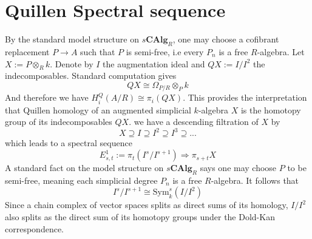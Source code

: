 \documentclass{article}
\newcommand{\Sym}{\textrm{Sym}}
\theoremstyle{definition}
\theoremstyle{definition}
\theoremstyle{definition}
\theoremstyle{definition}
\theoremstyle{definition}
\theoremstyle{definition}
\theoremstyle{definition}
\theoremstyle{definition}
\begin{document}
\appendix

\section{Quillen Spectral sequence}
By the standard model structure on $s \textbf{CAlg}_R$, one may choose a cofibrant replacement $P\to A$ such that $P$ is semi-free, i.e every $P_n$ is a free $R$-algebra.  Let $X:= P\otimes_R k$. Denote by $I$ the augmentation ideal and $QX:=I/I^2$ the indecomposables. Standard computation gives
\[QX\cong \Omega_{P/R}\otimes_P k\]
And therefore we have $H_i^Q(A/R)\cong \pi_i(QX)$. This provides the interpretation that Quillen homology of an augmented simplicial $k$-algebra $X$ is the homotopy group of its indecomposables $QX$. we have a descending filtration of $X$ by 
\[X\supseteq I\supseteq I^2\supseteq I^3\supseteq ...\]
which leads to a spectral sequence 
\[E^1_{s,t}:= \pi_t(I^s/I^{s+1})\Rightarrow \pi_{s+t} X\]
A standard fact on the model structure on $s \textbf{CAlg}_R$ says one may choose $P$ to be semi-free, meaning each simplicial degree $P_n$ is a free $R$-algebra. It follows that 
\[I^s/I^{s+1}\cong \Sym_k^s(I/I^2) \]
Since a chain complex of vector spaces splits as direct sums of its homology, $I/I^2$ also splits as the direct sum of its homotopy groups under the Dold-Kan correspondence.
\end{document}
